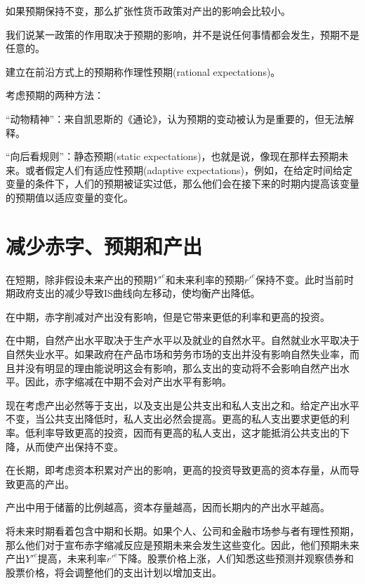 \documentclass{article}
\begin{document}
如果预期保持不变，那么扩张性货币政策对产出的影响会比较小。

我们说某一政策的作用取决于预期的影响，并不是说任何事情都会发生，预期不是任意的。

建立在前沿方式上的预期称作理性预期(rational expectations)。

\hspace*{\fill}

考虑预期的两种方法：

“动物精神”：来自凯恩斯的《通论》，认为预期的变动被认为是重要的，但无法解释。

“向后看规则”：静态预期(static expectations)，也就是说，像现在那样去预期未来。或者假定人们有适应性预期(adaptive expectations)，例如，在给定时间给定变量的条件下，人们的预期被证实过低，那么他们会在接下来的时期内提高该变量的预期值以适应变量的变化。

\section{减少赤字、预期和产出}

在短期，除非假设未来产出的预期$ Y'^e $和未来利率的预期$ r'^e $保持不变。此时当前时期政府支出的减少导致IS曲线向左移动，使均衡产出降低。

在中期，赤字削减对产出没有影响，但是它带来更低的利率和更高的投资。

在中期，自然产出水平取决于生产水平以及就业的自然水平。自然就业水平取决于自然失业水平。如果政府在产品市场和劳务市场的支出并没有影响自然失业率，而且并没有明显的理由能说明这会有影响，那么支出的变动将不会影响自然产出水平。因此，赤字缩减在中期不会对产出水平有影响。

现在考虑产出必然等于支出，以及支出是公共支出和私人支出之和。给定产出水平不变，当公共支出降低时，私人支出必然会提高。更高的私人支出要求更低的利率。低利率导致更高的投资，因而有更高的私人支出，这才能抵消公共支出的下降，从而使产出保持不变。

\hspace*{\fill}

在长期，即考虑资本积累对产出的影响，更高的投资导致更高的资本存量，从而导致更高的产出。

产出中用于储蓄的比例越高，资本存量越高，因而长期内的产出水平越高。

将未来时期看着包含中期和长期。如果个人、公司和金融市场参与者有理性预期，那么他们对于宣布赤字缩减反应是预期未来会发生这些变化。因此，他们预期未来产出$ Y'^e $提高，未来利率$ r'^e $下降。股票价格上涨，人们知悉这些预测并观察债券和股票价格，将会调整他们的支出计划以增加支出。
\end{document}
